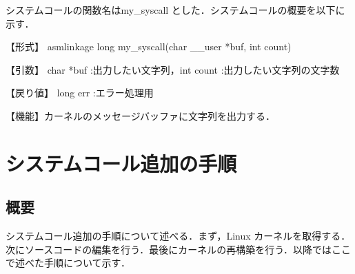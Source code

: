 \documentclass[12pt]{jsarticle}
\begin{document}
システムコールの関数名はmy\_syscall とした．システムコールの概要を以下に示す．

【形式】 asmlinkage long my\_syscall(char \_\_user *buf, int count)

【引数】 char *buf :出力したい文字列，int count :出力したい文字列の文字数

【戻り値】 long err :エラー処理用

【機能】カーネルのメッセージバッファに文字列を出力する．

\section{システムコール追加の手順}\label{sec:tejun}
 \subsection{概要}
システムコール追加の手順について述べる．まず，Linux カーネルを取得する．次にソースコードの編集を行う．最後にカーネルの再構築を行う．以降ではここで述べた手順について示す．
\end{document}
